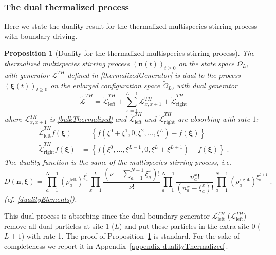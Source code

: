 \documentclass[10pt]{article}
\numberwithin{equation}{section}
\numberwithin{equation}{subsection}
\newtheorem{proposition}{Proposition}
\newcommand{\dt}{\;.}
\begin{document}
\subsubsection{The dual thermalized process}\label{subsection-dualTHM}
Here we state the duality result for the thermalized multispecies stirring process with boundary driving.
\begin{proposition}[Duality for the thermalized multispecies stirring process]\label{proposition-dualityTHM}
The thermalized multispecies stirring process $(\bm{n}(t))_{t\geq 0}$ on the state space $\Omega_{L}$, with generator $\mathcal{L}^{TH}$ defined in \eqref{thermalizedGenerator} is dual to the process $(\bm{\xi}(t))_{t\geq 0}$ on the enlarged configuration space $\widetilde{\Omega}_{L}$, with dual generator
\begin{equation}
	\widetilde{\mathcal{L}}^{TH}=\widetilde{\mathcal{L}}_{\text{left}}^{TH}+\sum_{x=1}^{L-1}\mathcal{L}_{x,x+1}^{TH}+\widetilde{\mathcal{L}}_{\text{right}}^{TH}
\end{equation}
where $\mathcal{L}^{TH}_{x,x+1}$ is \eqref{bulkThermalized} and $\widetilde{\mathcal{L}}_{\text{left}}^{TH}$ and $\widetilde{\mathcal{L}}_{\text{right}}^{TH}$ are absorbing with rate $1$:
\begin{align}
	\widetilde{\mathcal{L}}_{\text{left}}^{TH}f(\bm{\xi})&=\left\{f(\xi^{0}+\xi^{1},0,\xi^{2},\ldots,\xi^{L})-f(\bm{\xi})\right\}\nonumber\\ \widetilde{\mathcal{L}}_{\text{right}}^{TH}f(\bm{\xi})&=\left\{f(\xi^{0},\ldots,\xi^{L-1},0,\xi^{L}+\xi^{L+1})-f(\bm{\xi})\right\}\dt
\end{align}
The duality function is the same of the multispecies stirring process, i.e. 
\begin{equation}
	D(\bm{n},\bm{\xi})=\prod_{a=1}^{N-1}\left(\rho_{a}^{\text{left}}\right)^{\xi_{a}^{0}}\prod_{x=1}^{L}\frac{(\nu-\sum_{a=1}^{N-1}\xi_{a}^{x})!}{\nu!}\prod_{a=1}^{N-1}\frac{n_{a}^{x}!}{(n_{a}^{x}-\xi_{a}^{x})!}\prod_{a=1}^{N-1}\left(\rho_{a}^{\text{right}}\right)^{\xi_{a}^{L+1}}\dt
\end{equation}
(cf. \eqref{dualityElements}).
\end{proposition}
This dual process is absorbing since the dual boundary generator $\mathcal{L}_{\text{left}}^{TH}$ ($\mathcal{L}_{\text{left}}^{TH}$) remove all dual particles at site $1$ ($L$) and put these particles in the extra-site $0$ ($L+1$) with rate 1.
The proof of Proposition~\ref{proposition-dualityTHM} is standard. For the sake of completeness we report it in Appendix~\ref{appendix-dualityThermalized}.
\end{document}
